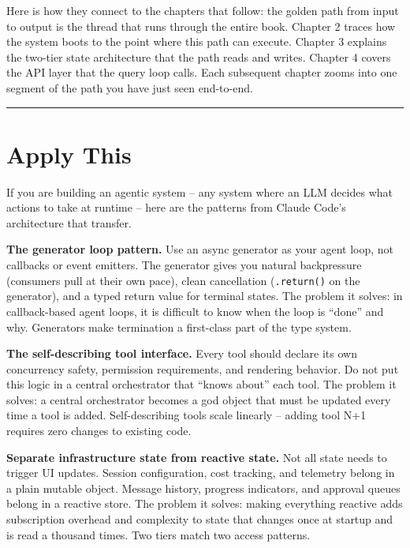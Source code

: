 \documentclass[
  english,
  11pt,
  letterpaper,
]{book}
\begin{document}
Here is how they connect to the chapters that follow: the golden path
from input to output is the thread that runs through the entire book.
Chapter 2 traces how the system boots to the point where this path can
execute. Chapter 3 explains the two-tier state architecture that the
path reads and writes. Chapter 4 covers the API layer that the query
loop calls. Each subsequent chapter zooms into one segment of the path
you have just seen end-to-end.

\begin{center}\rule{0.5\linewidth}{0.5pt}\end{center}

\section{Apply This}\label{apply-this}

If you are building an agentic system -- any system where an LLM decides
what actions to take at runtime -- here are the patterns from Claude
Code's architecture that transfer.

\textbf{The generator loop pattern.} Use an async generator as your
agent loop, not callbacks or event emitters. The generator gives you
natural backpressure (consumers pull at their own pace), clean
cancellation (\texttt{.return()} on the generator), and a typed return
value for terminal states. The problem it solves: in callback-based
agent loops, it is difficult to know when the loop is ``done'' and why.
Generators make termination a first-class part of the type system.

\textbf{The self-describing tool interface.} Every tool should declare
its own concurrency safety, permission requirements, and rendering
behavior. Do not put this logic in a central orchestrator that ``knows
about'' each tool. The problem it solves: a central orchestrator becomes
a god object that must be updated every time a tool is added.
Self-describing tools scale linearly -- adding tool N+1 requires zero
changes to existing code.

\textbf{Separate infrastructure state from reactive state.} Not all
state needs to trigger UI updates. Session configuration, cost tracking,
and telemetry belong in a plain mutable object. Message history,
progress indicators, and approval queues belong in a reactive store. The
problem it solves: making everything reactive adds subscription overhead
and complexity to state that changes once at startup and is read a
thousand times. Two tiers match two access patterns.
\end{document}
